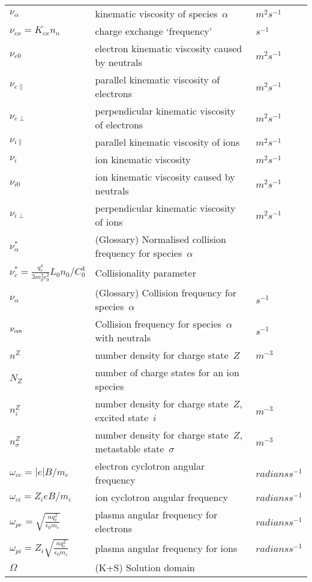 \begin{longtable}{|p{3.0cm}|p{10.0cm}|p{3.0cm}|}
$\nu_\alpha$ & kinematic viscosity of species~$\alpha$ & $m^2 s^{-1}$ \\
$\nu_{cx}=K_{cx} n_n$ & charge exchange `frequency'  & $s^{-1}$ \\
$\nu_{e0}$ & electron kinematic viscosity caused by neutrals & $m^2 s^{-1}$ \\
$\nu_{e\|}$ & parallel kinematic viscosity of electrons & $m^2 s^{-1}$ \\
$\nu_{e\perp}$ & perpendicular kinematic viscosity of electrons & $m^2 s^{-1}$ \\
$\nu_{i\|}$ & parallel kinematic viscosity of ions & $m^2 s^{-1}$ \\
$\nu_i$ & ion kinematic viscosity & $m^2 s^{-1}$ \\
$\nu_{i0}$ & ion kinematic viscosity caused by neutrals & $m^2 s^{-1}$ \\
$\nu_{i\perp}$ & perpendicular kinematic viscosity of ions & $m^2 s^{-1}$ \\
$\nu^{*}_\alpha$ & (Glossary) Normalised collision frequency for species~$\alpha$ & \\
$\nu^{*}_c = \frac{q_e^4}{3 m_p^2\epsilon_0^2} L_0 n_0 /C_0^4$ & Collisionality parameter & \\
$\nu_\alpha$ & (Glossary) Collision frequency for species~$\alpha$ & $s^{-1}$ \\
$\nu_{\alpha{\sf n}}$ & Collision frequency for species~$\alpha$ with neutrals & $s^{-1}$ \\
$n^Z$ & number density for charge state~$Z$  & $m^{-3}$ \\
$N_Z$ & number of charge states for an ion species & \\
$n^Z_i$ & number density for charge state~$Z$, excited state~$i$  & $m^{-3}$ \\
$n^Z_\sigma$ & number density for charge state~$Z$, metastable state~$\sigma$  & $m^{-3}$ \\
$\omega_{ce}= |e|B/m_e$ & electron cyclotron angular frequency & $radians s^{-1}$ \\
$\omega_{ci}= Z_i e B/m_i$ & ion cyclotron angular frequency & $radians s^{-1}$ \\
$\omega_{pe}= \sqrt{\frac{nq_e^2}{\epsilon_0 m_e}}$ & plasma angular frequency for electrons & $radians s^{-1}$ \\
$\omega_{pi}= Z_i\sqrt{\frac{nq_e^2}{\epsilon_0 m_i}}$ & plasma angular frequency for ions & $radians s^{-1}$ \\
$\Omega$ &  (K+S) Solution domain & \\

\end{longtable}

